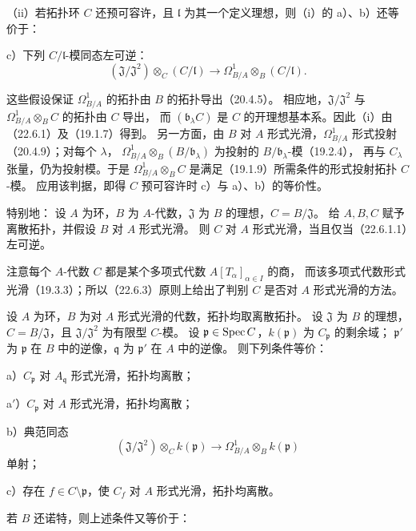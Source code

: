 \noindent（ii）若拓扑环 $C$ 还预可容许，且 $\mathfrak l$ 为其一个定义理想，则（i）的 a）、b）还等价于：

\noindent c）下列 $C/\mathfrak l$-模同态左可逆：
\[
 (\mathfrak J/\mathfrak J^2)\otimes_C(C/\mathfrak l)
 \longrightarrow\Omega^1_{B/A}\otimes_B(C/\mathfrak l).
\]

\eproof
这些假设保证 $\Omega^1_{B/A}$ 的拓扑由 $B$ 的拓扑导出（20.4.5）。
相应地，$\mathfrak J/\mathfrak J^2$ 与 $\Omega^1_{B/A}\otimes_BC$ 的拓扑由 $C$ 导出，
而 $(\mathfrak b_\lambda C)$ 是 $C$ 的开理想基本系。因此（i）由（22.6.1）及（19.1.7）得到。
另一方面，由 $B$ 对 $A$ 形式光滑，$\Omega^1_{B/A}$ 形式投射（20.4.9）；对每个 $\lambda$，
$\Omega^1_{B/A}\otimes_B(B/\mathfrak b_\lambda)$ 为投射的 $B/\mathfrak b_\lambda$-模（19.2.4），
再与 $C_\lambda$ 张量，仍为投射模。于是 $\Omega^1_{B/A}\otimes_BC$ 是满足（19.1.9）所需条件的形式投射拓扑 $C$-模。
应用该判据，即得 $C$ 预可容许时 c）与 a）、b）的等价性。
\finishproof

特别地：
设 $A$ 为环，$B$ 为 $A$-代数，$\mathfrak J$ 为 $B$ 的理想，$C=B/\mathfrak J$。
给 $A,B,C$ 赋予离散拓扑，并假设 $B$ 对 $A$ 形式光滑。
则 $C$ 对 $A$ 形式光滑，当且仅当（22.6.1.1）左可逆。

注意每个 $A$-代数 $C$ 都是某个多项式代数 $A[T_\alpha]_{\alpha\in I}$ 的商，
而该多项式代数形式光滑（19.3.3）；所以（22.6.3）原则上给出了判别 $C$ 是否对 $A$ 形式光滑的方法。

设 $A$ 为环，$B$ 为对 $A$ 形式光滑的代数，拓扑均取离散拓扑。
设 $\mathfrak J$ 为 $B$ 的理想，$C=B/\mathfrak J$，且 $\mathfrak J/\mathfrak J^2$ 为有限型 $C$-模。
设 $\mathfrak p\in\operatorname{Spec} C$，$k(\mathfrak p)$ 为 $C_{\mathfrak p}$ 的剩余域；
$\mathfrak p'$ 为 $\mathfrak p$ 在 $B$ 中的逆像，$\mathfrak q$ 为 $\mathfrak p'$ 在 $A$ 中的逆像。
则下列条件等价：

\noindent a）$C_{\mathfrak p}$ 对 $A_{\mathfrak q}$ 形式光滑，拓扑均离散；

\noindent a$'$）$C_{\mathfrak p}$ 对 $A$ 形式光滑，拓扑均离散；

\noindent b）典范同态
\begin{equation}
 (\mathfrak J/\mathfrak J^2)\otimes_Ck(\mathfrak p)
 \longrightarrow\Omega^1_{B/A}\otimes_Bk(\mathfrak p)
 \tag{22.6.4.1}
\end{equation}
单射；

\noindent c）存在 $f\in C\setminus\mathfrak p$，使 $C_f$ 对 $A$ 形式光滑，拓扑均离散。

若 $B$ 还诺特，则上述条件又等价于：

